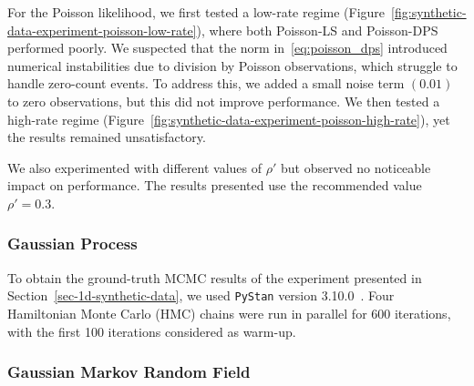 For the Poisson likelihood, we first tested a low-rate regime (Figure~\ref{fig:synthetic-data-experiment-poisson-low-rate}), where both Poisson-LS and Poisson-DPS performed poorly. We suspected that the norm in~\eqref{eq:poisson_dps} introduced numerical instabilities due to division by Poisson observations, which struggle to handle zero-count events. To address this, we added a small noise term $(0.01)$ to zero observations, but this did not improve performance. We then tested a high-rate regime (Figure~\ref{fig:synthetic-data-experiment-poisson-high-rate}), yet the results remained unsatisfactory.  

We also experimented with different values of $\rho'$ but observed no noticeable impact on performance. The results presented use the recommended value $\rho' = 0.3 $.  
  
\subsubsection{Gaussian Process}
To obtain the ground-truth MCMC results of the experiment presented in Section~\ref{sec-1d-synthetic-data}, we used \texttt{PyStan} version 3.10.0~\citep{pystan}. Four Hamiltonian Monte Carlo (HMC) chains were run in parallel for 600 iterations, with the first 100 iterations considered as warm-up. 






\subsubsection{Gaussian Markov Random Field}

